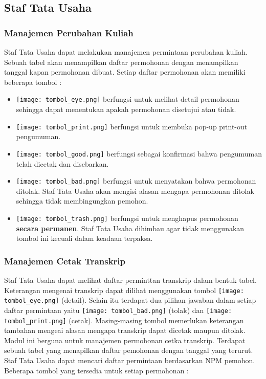 \subsection{Staf Tata Usaha}
\subsubsection{Manajemen Perubahan Kuliah}
Staf Tata Usaha dapat melakukan manajemen permintaan perubahan kuliah. Sebuah tabel akan menampilkan daftar permohonan dengan menampilkan tanggal kapan permohonan dibuat.
Setiap daftar permohonan akan memiliki beberapa tombol :

\begin{itemize}
	\item \texttt{[image: tombol\_eye.png]} berfungsi untuk melihat detail permohonan sehingga dapat menentukan apakah permohonan disetujui atau tidak.
	\item \texttt{[image: tombol\_print.png]} berfungsi untuk membuka pop-up print-out pengumuman.
	\item \texttt{[image: tombol\_good.png]} berfungsi sebagai konfirmasi bahwa pengumuman telah dicetak dan disebarkan.
	\item \texttt{[image: tombol\_bad.png]} berfungsi untuk menyatakan bahwa permohonan ditolak. Staf Tata Usaha akan mengisi alasan mengapa permohonan ditolak sehingga tidak membingungkan pemohon.
	\item \texttt{[image: tombol\_trash.png]} berfungsi untuk menghapus permohonan \textbf{secara permanen}. Staf Tata Usaha dihimbau agar tidak menggunakan tombol ini kecuali dalam keadaan terpaksa.
\end{itemize}

\subsubsection{Manajemen Cetak Transkrip}
Staf Tata Usaha dapat melihat daftar perminttan transkrip dalam bentuk tabel. Keterangan mengenai transkrip dapat dilihat menggunakan tombol \texttt{[image: tombol\_eye.png]} (detail). Selain itu terdapat dua pilihan jawaban dalam setiap daftar permintaan yaitu \texttt{[image: tombol\_bad.png]} (tolak) dan 
\texttt{[image: tombol\_print.png]} (cetak). Masing-masing tombol memerlukan keterangan tambahan mengeai alasan mengapa transkrip dapat dicetak maupun ditolak.\noindent
Modul ini berguna untuk manajemen permohonan cetka transkrip. Terdapat sebuah tabel yang menapilkan daftar pemohonan dengan tanggal yang terurut. Staf Tata Usaha dapat mencari daftar permintaan berdasarkan NPM pemohon.
Beberapa tombol yang tersedia untuk setiap permohonan :

